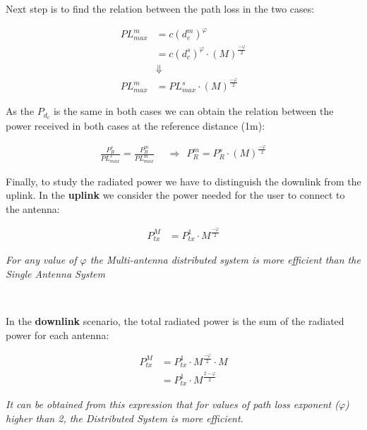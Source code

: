 Next step is to find the relation between the path loss in the two cases:

\begin{align*}
PL^m_{max} &= c(d^m_c) ^{\varphi} \\
	&= c(d^s_c)^{\varphi}\cdot (M)^{\frac{-\varphi}{2}}\\ %
&\Downarrow\\	
	PL^m_{max} &= PL^s_{max} \cdot (M)^{\frac{-\varphi}{2}}
\end{align*}

As the $P_{d_{c}}$ is the same in both cases we can obtain the relation between the power received in both cases at the reference distance (1m):

\begin{align*}
\frac{P^s_R}{PL^s_{max}}=\frac{P^m_R}{PL^m_{max}}\ \ &\Longrightarrow \ \ P^m_R = P^s_R \cdot (M)^{\frac{-\varphi}{2}}
\end{align*}

Finally, to study the radiated power we have to distinguish the downlink from the uplink. In the \textbf{uplink} we consider the power needed for the user to connect to the antenna:

\begin{align*}
P^M_{tx} &= P^1_{tx} \cdot M^{\frac{-\varphi}{2}}
\end{align*}

\textit{For any value of $\varphi$ the Multi-antenna distributed system is more efficient than the Single Antenna System}

\

In the \textbf{downlink} scenario, the total radiated power is the sum of the radiated power for each antenna:

\begin{align*}
P^M_{tx} &= P^1_{tx} \cdot M^{\frac{-\varphi}{2}} \cdot M\\
&=P^1_{tx} \cdot M^{\frac{2-\varphi}{2}}
\end{align*}

\textit{It can be obtained from this expression that for values of path loss exponent ($\varphi$) higher than 2, the Distributed System is more efficient.}